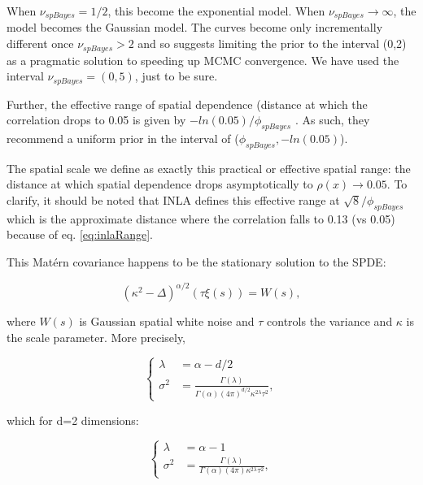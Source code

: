 \documentclass[letterpaper,portrait,11pt]{scrartcl}
\numberwithin{equation}{section}    %
\numberwithin{figure}{section}    %
\numberwithin{table}{section}       %
\begin{document}
\begin{appendices}
When $\nu_{spBayes} = 1/2$, this become the exponential model. When $\nu_{spBayes}  \rightarrow \infty$, the model becomes the Gaussian model. The curves become only incrementally different once $\nu_{spBayes} > 2$ and so \textcite{finley:2007} suggests limiting the prior to the interval (0,2) as a pragmatic solution to speeding up MCMC convergence. We have used the interval $\nu_{spBayes}= (0,5)$, just to be sure. 

Further, the effective range of spatial dependence (distance at which the correlation drops to 0.05 is given by $-ln(0.05)/\phi_{spBayes}$ \parencite{finley:2007}. As such, they recommend a uniform prior in the interval of ($\phi_{spBayes}, -ln(0.05)$). 

The spatial scale we define as exactly this practical or effective spatial range: the distance at which spatial dependence drops asymptotically to $\rho(x) \rightarrow 0.05$. To clarify, it should be noted that INLA defines this effective range at $\sqrt{8}/\phi_{spBayes}$ which is the approximate distance where the correlation falls to 0.13 (vs 0.05) because of eq. \ref{eq:inlaRange}. 

This Mat\'{e}rn covariance happens to be the stationary solution to the SPDE:

\begin{equation}
(\kappa^2 - \Delta)^{\alpha/2} ( \tau \xi(s)) = W(s),
\end{equation}

where $W(s)$ is Gaussian spatial white noise and $\tau$ controls the variance and $\kappa$ is the scale parameter. More precisely,

\begin{equation*}
  \begin{cases}
    \lambda  &=  \alpha - d/2 \\
    \sigma^2 &=  \frac{\Gamma(\lambda)}{\Gamma(\alpha)(4\pi)^{d/2}{\kappa}^{2\lambda} \tau^2 },
  \end{cases}
\end{equation*}

which for d=2 dimensions:

\begin{equation*}
\begin{cases}
\lambda  &=  \alpha - 1 \\
\sigma^2 &=  \frac{\Gamma(\lambda)}{\Gamma(\alpha)(4\pi){\kappa}^{2\lambda} \tau^2 },
\end{cases}
\end{equation*}


\end{appendices}
\end{document}
